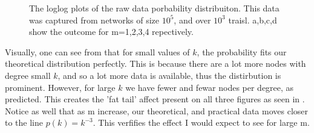 \documentclass[]{article}
\begin{document}
 \begin{figure}[H]
 		\baselineskip
 	\caption{The loglog plots of the raw data porbability distribuiton. This data was captured from networks of size $10^5$, and over $10^3$ traisl. a,b,c,d show the outcome for m=1,2,3,4 repectively.}
\end{figure}
 
Visually, one can see from that for small values of $k$, the probability fits our theoretical distribution perfectly. This is because there are a lot more nodes with degree small $k$, and so a lot more data is available, thus the distirbution is prominent. However, for large $k$ we have fewer and fewar nodes per degree, as predicted. This creates the 'fat tail' affect present on all three figures as seen in . \\
Notice as well that as m increase, our theoretical, and practical data moves closer to the line $p(k)=k^{-3}$. This verfifies the effect I would expect to see for large m.
\end{document}
